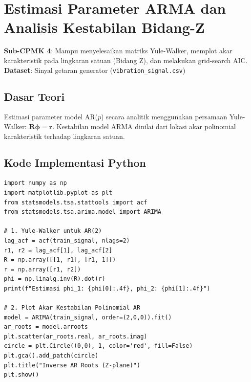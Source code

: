 \documentclass[11pt,a4paper]{report}
\begin{document}
\newpage

\chapter{Estimasi Parameter ARMA dan Analisis Kestabilan Bidang-Z}

\begin{tcolorbox}[title=Informasi Modul 4]
\textbf{Sub-CPMK 4}: Mampu menyelesaikan matriks Yule-Walker, memplot akar karakteristik pada lingkaran satuan (Bidang Z), dan melakukan grid-search AIC.\\
\textbf{Dataset}: Sinyal getaran generator (\texttt{vibration\_signal.csv})
\end{tcolorbox}

\section{Dasar Teori}
Estimasi parameter model AR($p$) secara analitik menggunakan persamaan Yule-Walker: $\mathbf{R} \boldsymbol{\phi} = \mathbf{r}$. Kestabilan model ARMA dinilai dari lokasi akar polinomial karakteristik terhadap lingkaran satuan.

\section{Kode Implementasi Python}
\begin{lstlisting}
import numpy as np
import matplotlib.pyplot as plt
from statsmodels.tsa.stattools import acf
from statsmodels.tsa.arima.model import ARIMA

# 1. Yule-Walker untuk AR(2)
lag_acf = acf(train_signal, nlags=2)
r1, r2 = lag_acf[1], lag_acf[2]
R = np.array([[1, r1], [r1, 1]])
r = np.array([r1, r2])
phi = np.linalg.inv(R).dot(r)
print(f"Estimasi phi_1: {phi[0]:.4f}, phi_2: {phi[1]:.4f}")

# 2. Plot Akar Kestabilan Polinomial AR
model = ARIMA(train_signal, order=(2,0,0)).fit()
ar_roots = model.arroots
plt.scatter(ar_roots.real, ar_roots.imag)
circle = plt.Circle((0,0), 1, color='red', fill=False)
plt.gca().add_patch(circle)
plt.title("Inverse AR Roots (Z-plane)")
plt.show()
\end{lstlisting}

\newpage

\end{document}

